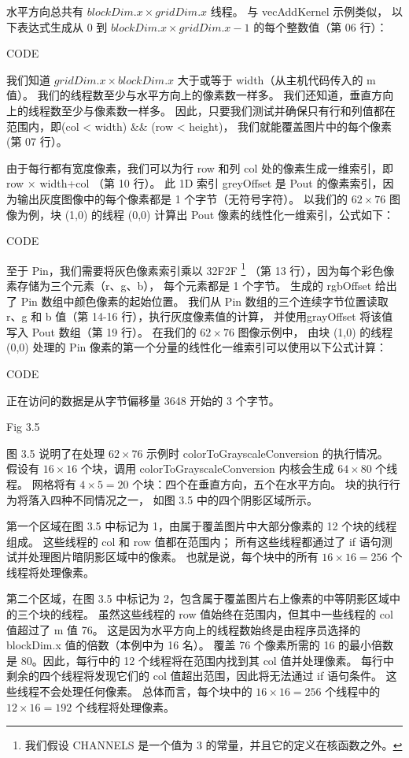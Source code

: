 水平方向总共有 $blockDim.x \times gridDim.x$ 线程。 与 vecAddKernel 示例类似，
以下表达式生成从 0 到 $blockDim.x \times gridDim.x - 1$ 的每个整数值（第 06 行）：

{\color{red} CODE}

我们知道 $gridDim.x \times blockDim.x$ 大于或等于 width（从主机代码传入的 m 值）。 
我们的线程数至少与水平方向上的像素数一样多。 我们还知道，垂直方向上的线程数至少与像素数一样多。 
因此，只要我们测试并确保只有行和列值都在范围内，即(col < width) \&\& (row < height)，
我们就能覆盖图片中的每个像素(第 07 行）。

由于每行都有宽度像素，我们可以为行 row 和列 col 处的像素生成一维索引，即 row × width+col （第 10 行）。 
此 1D 索引 greyOffset 是 Pout 的像素索引，因为输出灰度图像中的每个像素都是 1 个字节（无符号字符）。 
以我们的 $62 \times 76$ 图像为例，块 (1,0) 的线程 (0,0) 计算出 Pout 像素的线性化一维索引，公式如下：

{\color{red} CODE}

至于 Pin，我们需要将灰色像素索引乘以 32F2F
\footnote{我们假设 CHANNELS 是一个值为 3 的常量，并且它的定义在核函数之外。}
（第 13 行），因为每个彩色像素存储为三个元素（r、g、b），
每个元素都是 1 个字节。 生成的 rgbOffset 给出了 Pin 数组中颜色像素的起始位置。 
我们从 Pin 数组的三个连续字节位置读取 r、g 和 b 值（第 14-16 行），执行灰度像素值的计算，
并使用grayOffset 将该值写入 Pout 数组（第 19 行）。 在我们的 $62 \times 76$ 图像示例中，
由块 (1,0) 的线程 (0,0) 处理的 Pin 像素的第一个分量的线性化一维索引可以使用以下公式计算：

{\color{red} CODE}

正在访问的数据是从字节偏移量 3648 开始的 3 个字节。

{\color{red} Fig 3.5}

图 3.5 说明了在处理 $62 \times 76$ 示例时 colorToGrayscaleConversion 的执行情况。 
假设有 $16 \times 16$ 个块，调用 colorToGrayscaleConversion 内核会生成 $64 \times 80$ 个线程。 
网格将有 $4 \times 5 = 20$ 个块：四个在垂直方向，五个在水平方向。 块的执行行为将落入四种不同情况之一，
如图 3.5 中的四个阴影区域所示。

第一个区域在图 3.5 中标记为 1，由属于覆盖图片中大部分像素的 12 个块的线程组成。 这些线程的 col 和 row 值都在范围内； 
所有这些线程都通过了 if 语句测试并处理图片暗阴影区域中的像素。 
也就是说，每个块中的所有 $16 \times 16 = 256$ 个线程将处理像素。

第二个区域，在图 3.5 中标记为 2，包含属于覆盖图片右上像素的中等阴影区域中的三个块的线程。 
虽然这些线程的 row 值始终在范围内，但其中一些线程的 col 值超过了 m 值 76。
这是因为水平方向上的线程数始终是由程序员选择的 blockDim.x 值的倍数（本例中为 16 名）。 
覆盖 76 个像素所需的 16 的最小倍数是 80。因此，每行中的 12 个线程将在范围内找到其 col 值并处理像素。 
每行中剩余的四个线程将发现它们的 col 值超出范围，因此将无法通过 if 语句条件。 这些线程不会处理任何像素。 
总体而言，每个块中的 $16 \times 16 = 256$ 个线程中的 $12 \times 16 = 192$ 个线程将处理像素。

